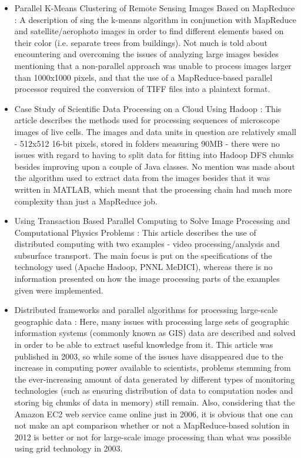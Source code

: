 \documentclass [12pt,a4paper]{report}
\begin{document}
\begin{itemize}
	\item Parallel K-Means Clustering of Remote Sensing Images Based on MapReduce \cite{Lv:2010:PKC:1927661.1927687}: A description of sing the k-means algorithm in conjunction with MapReduce and satellite/aerophoto images in order to find different elements based on their color (i.e. separate trees from buildings). Not much is told about encountering and overcoming the issues of analyzing large images besides mentioning that a non-parallel approach was unable to process images larger than 1000x1000 pixels, and that the use of a MapReduce-based parallel processor required the conversion of TIFF files into a plaintext format. 
	\item Case Study of Scientific Data Processing on a Cloud Using Hadoop \cite{Zhang:2009:CSS:2127968.2128002}: This article describes the methods used for processing sequences of microscope images of live cells. The images and data units in question are relatively small - 512x512 16-bit pixels, stored in folders measuring 90MB - there were no issues with regard to having to split data for fitting into Hadoop DFS chunks besides improving upon a couple of Java classes. No mention was made about the algorithm used to extract data from the images besides that it was written in MATLAB, which meant that the processing chain had much more complexity than just a MapReduce job.
	\item Using Transaction Based Parallel Computing to Solve Image Processing and Computational Physics Problems \cite{trease08}: This article describes the use of distributed computing with two examples - video processing/analysis and subsurface transport. The main focus is put on the specifications of the technology used (Apache Hadoop, PNNL MeDICI), whereas there is no information presented on how the image processing parts of the examples given were implemented.
	\item Distributed frameworks and parallel algorithms for processing large-scale geographic data \cite{Hawick:2003:DFP:958021.958024}: Here, many issues with processing large sets of geographic information systems (commonly known as GIS) data are described and solved in order to be able to extract useful knowledge from it. This article was published in 2003, so while some of the issues have disappeared due to the increase in computing power available to scientists, problems stemming from the ever-increasing amount of data generated by different types of monitoring technologies (such as ensuring distribution of data to computation nodes and storing big chunks of data in memory) still remain. Also, considering that the Amazon EC2 \cite{website:amazon_ec2} web service came online just in 2006, it is obvious that one can not make an apt comparison whether or not a MapReduce-based solution in 2012 is better or not for large-scale image processing than what was possible using grid technology in 2003.

\end{itemize}
\end{document}
